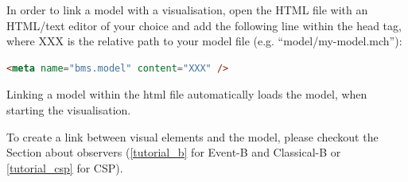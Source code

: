 In order to link a model with a visualisation, open the HTML file with an HTML/text editor of your choice and add the following line within the head tag, where XXX is the relative path to your model file (e.g. ``model/my-model.mch''):

\begin{lstlisting}[language=html]
<meta name="bms.model" content="XXX" />
\end{lstlisting}

Linking a model within the html file automatically loads the model, when starting the visualisation.

To create a link between visual elements and the model, please checkout the Section about observers (\ref{tutorial_b} for Event-B and Classical-B or \ref{tutorial_csp} for CSP).
